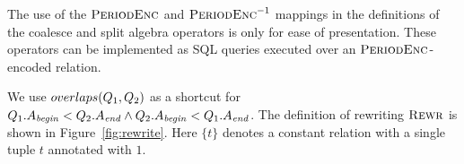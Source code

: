 The use of the $\textsc{PeriodEnc}$ and $\textsc{PeriodEnc}^{-1}$ mappings in the definitions of the coalesce and split algebra operators is only for ease of presentation. These  operators can be implemented as SQL queries executed over an $\textsc{PeriodEnc}$-encoded relation.

\begin{defi}\label{def:repr-N-rewriting}
We use $overlaps(Q_1, Q_2)$ as a %
shortcut for
$Q_1.A_\mathit{begin} < Q_2.A_\mathit{end} \land Q_2.A_\mathit{begin} < Q_1.A_\mathit{end}$.
  The definition of rewriting $\textsc{Rewr}$ is shown in Figure~\ref{fig:rewrite}.
Here %
$\{t\}$ denotes a constant relation with a single tuple $t$ annotated with $1$.
\end{defi}

